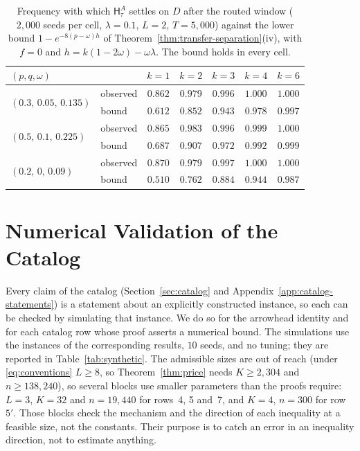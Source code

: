 \documentclass[anon]{alt2027} %
\newcommand{\Hyb}{\mathsf{H}}
\begin{document}
\begin{table}[h]
\centering
\caption{Frequency with which $\Hyb^A_\tau$ settles on $D$ after the routed
window ($2{,}000$ seeds per cell, $\lambda=0.1$, $L=2$, $T=5{,}000$) against the
lower bound $1-e^{-8(p-\omega)h}$ of Theorem~\ref{thm:transfer-separation}(iv),
with $f=0$ and $h=k(1-2\omega)-\omega\lambda$. The bound holds in every cell.}
\label{tab:transfer-check}
\small
\begin{tabular}{@{}llccccc@{}}
\toprule
$(p,q,\omega)$ & & $k=1$ & $k=2$ & $k=3$ & $k=4$ & $k=6$ \\
\midrule
\multirow{2}{*}{$(0.3,\,0.05,\,0.135)$} & observed & $0.862$ & $0.979$ & $0.996$ & $1.000$ & $1.000$ \\
 & bound & $0.612$ & $0.852$ & $0.943$ & $0.978$ & $0.997$ \\
\midrule
\multirow{2}{*}{$(0.5,\,0.1,\,0.225)$} & observed & $0.865$ & $0.983$ & $0.996$ & $0.999$ & $1.000$ \\
 & bound & $0.687$ & $0.907$ & $0.972$ & $0.992$ & $0.999$ \\
\midrule
\multirow{2}{*}{$(0.2,\,0,\,0.09)$} & observed & $0.870$ & $0.979$ & $0.997$ & $1.000$ & $1.000$ \\
 & bound & $0.510$ & $0.762$ & $0.884$ & $0.944$ & $0.987$ \\
\bottomrule
\end{tabular}
\end{table}

\section{Numerical Validation of the Catalog}
\label{app:synthetic}

Every claim of the catalog (Section~\ref{sec:catalog} and
Appendix~\ref{app:catalog-statements}) is a statement about an explicitly
constructed instance, so each can be checked by simulating that instance. We
do so for the arrowhead identity and for each catalog row whose proof asserts
a numerical bound. The simulations use the instances of the
corresponding results, $10$ seeds, and no tuning; they are reported in
Table~\ref{tab:synthetic}. The admissible sizes are out of reach (under
\eqref{eq:conventions} $L\ge8$, so Theorem~\ref{thm:price} needs $K\ge2{,}304$
and $n\ge138{,}240$), so several blocks use smaller parameters than the proofs
require: $L=3$, $K=32$ and $n=19{,}440$ for rows~4, 5 and~7, and $K=4$,
$n=300$ for row~$5'$. Those blocks check the mechanism and the direction of
each inequality at a feasible size, not the constants. Their purpose is to
catch an error in an inequality direction, not to estimate anything.
\end{document}
